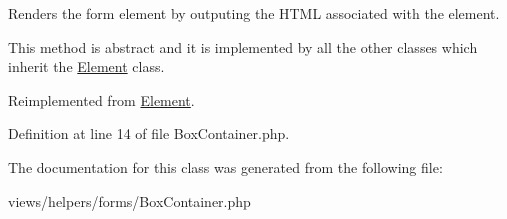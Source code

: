 Renders the form element by outputing the HTML associated with the element. 

This method is abstract and it is implemented by all the other classes which inherit the \hyperlink{class_element}{Element} class. 

Reimplemented from \hyperlink{class_element_a8fd45d1d43cf11f3dadab39b0306a960}{Element}.



Definition at line 14 of file BoxContainer.php.



The documentation for this class was generated from the following file:\begin{DoxyCompactItemize}
\item 
views/helpers/forms/BoxContainer.php\end{DoxyCompactItemize}
